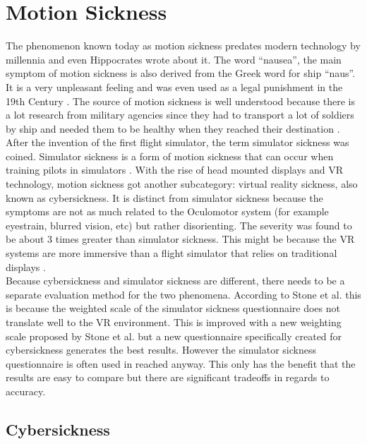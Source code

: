 

\section{Motion Sickness}\label{motion-sickness}

The phenomenon known today as motion sickness predates modern technology
by millennia and even Hippocrates wrote about it. The word ``nausea'',
the main symptom of motion sickness is also derived from the Greek word
for ship ``naus''. \cite{Golding} It is a very
unpleasant feeling and was even used as a legal punishment in the 19th
Century \cite{Reason}. The source of motion sickness is
well understood because there is a lot research from military agencies
since they had to transport a lot of soldiers by ship and needed them to
be healthy when they reached their destination
\cite{Johnson}. After the invention of the first flight
simulator, the term simulator sickness was coined. Simulator sickness is
a form of motion sickness that can occur when training pilots in
simulators \cite{Johnson}. With the rise of head mounted
displays and VR technology, motion sickness got another subcategory:
virtual reality sickness, also known as cybersickness. It is distinct
from simulator sickness because the symptoms are not as much related to
the Oculomotor system (for example eyestrain, blurred vision, etc) but
rather disorienting. The severity was found to be about 3 times greater
than simulator sickness. This might be because the VR systems are more
immersive than a flight simulator that relies on traditional displays
\cite{Stanney}.\\Because cybersickness and simulator
sickness are different, there needs to be a separate evaluation method
for the two phenomena. According to Stone et al. \cite{Stone} this is because the
weighted scale of the simulator sickness questionnaire does not
translate well to the VR environment. This is improved with a new
weighting scale proposed by Stone et al. \cite{Stone} but a new questionnaire
specifically created for cybersickness generates the best results.
However the simulator sickness questionnaire is often used in reached
anyway. This only has the benefit that the results are easy to compare
but there are significant tradeoffs in regards to accuracy.

\subsection{Cybersickness}\label{cybersickness}

